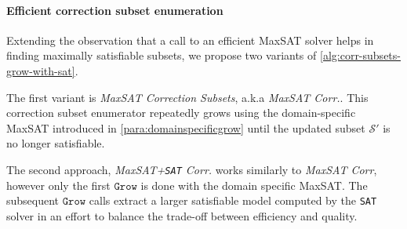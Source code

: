 \documentclass[a4paper,UKenglish,cleveref, autoref, thm-restate, pdfa]{lipics-v2021}
\newcommand\m[1]{\mathcal{#1}}
\renewcommand\comment[1]{}
\newcommand{\bart}[1]{{\comment{\color{OliveGreen}Bart: #1}}}
\newcommand\mm[1]{\ensuremath{#1}\xspace}
\newcommand\call[1]{\mm{\texttt{#1}}}
\newcommand\sat{\texttt{{SAT}}\xspace}
\newcommand\grow{\mm{\call{Grow}}}
\newcommand\maxsat{MaxSAT\xspace}
\begin{document}
%		
%		
	
	
	
	\paragraph{Efficient correction subset enumeration} Extending the observation that a call to an efficient \maxsat solver helps in finding maximally satisfiable subsets, we propose two variants of \cref{alg:corr-subsets-grow-with-sat}.
	
	The first variant is \emph{\maxsat Correction Subsets}, a.k.a \emph{\maxsat Corr.}. This correction subset enumerator repeatedly grows using the domain-specific \maxsat introduced in \cref{para:domainspecificgrow} until the updated subset $\m{S}'$ is no longer satisfiable. 
	
	The second approach, \emph{\maxsat+\sat Corr.} works similarly to \emph{\maxsat Corr}, however only the first \grow is done with the domain specific \maxsat. The subsequent \grow calls extract a larger satisfiable model computed by the \sat solver in an effort to balance the trade-off between efficiency and quality. 
	
\end{document}
